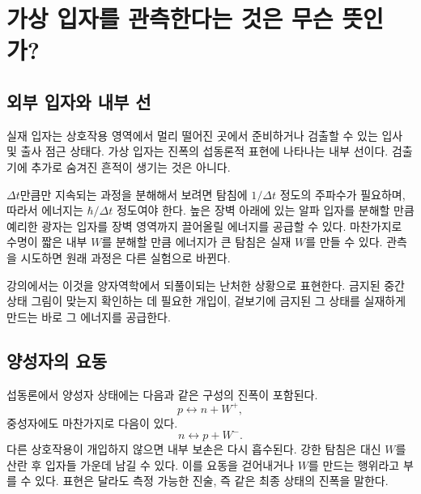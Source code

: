 \section{가상 입자를 관측한다는 것은 무슨 뜻인가?}

\subsection{외부 입자와 내부 선}

실재 입자는 상호작용 영역에서 멀리 떨어진 곳에서 준비하거나 검출할 수 있는 입사 및 출사 점근 상태다. 가상 입자는 진폭의 섭동론적 표현에 나타나는 내부 선이다. 검출기에 추가로 숨겨진 흔적이 생기는 것은 아니다.

\begin{classroomqa}\end{classroomqa}

\(\Delta t\)만큼만 지속되는 과정을 분해해서 보려면 탐침에 \(1/\Delta t\) 정도의 주파수가 필요하며, 따라서 에너지는 \(\hbar/\Delta t\) 정도여야 한다. 높은 장벽 아래에 있는 알파 입자를 분해할 만큼 예리한 광자는 입자를 장벽 영역까지 끌어올릴 에너지를 공급할 수 있다. 마찬가지로 수명이 짧은 내부 \(W\)를 분해할 만큼 에너지가 큰 탐침은 실재 \(W\)를 만들 수 있다. 관측을 시도하면 원래 과정은 다른 실험으로 바뀐다.

강의에서는 이것을 양자역학에서 되풀이되는 난처한 상황으로 표현한다. 금지된 중간 상태 그림이 맞는지 확인하는 데 필요한 개입이, 겉보기에 금지된 그 상태를 실재하게 만드는 바로 그 에너지를 공급한다.

\subsection{양성자의 요동}

섭동론에서 양성자 상태에는 다음과 같은 구성의 진폭이 포함된다.
\begin{equation}
  p\longleftrightarrow n+W^+,
\end{equation}
중성자에도 마찬가지로 다음이 있다.
\begin{equation}
  n\longleftrightarrow p+W^-.
\end{equation}
다른 상호작용이 개입하지 않으면 내부 보손은 다시 흡수된다. 강한 탐침은 대신 \(W\)를 산란 후 입자들 가운데 남길 수 있다. 이를 요동을 걷어내거나 \(W\)를 만드는 행위라고 부를 수 있다. 표현은 달라도 측정 가능한 진술, 즉 같은 최종 상태의 진폭을 말한다.

